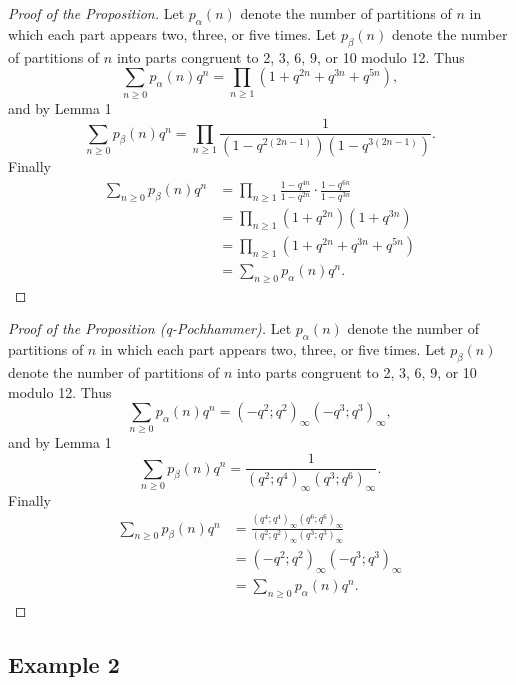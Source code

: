\begin{proof}[Proof of the Proposition]
        Let $p_\alpha(n)$ denote the number of partitions of $n$
        in which each part appears two, three, or five times.
        Let $p_\beta(n)$ denote the number of partitions of $n$
        into parts congruent to 2, 3, 6, 9, or 10 modulo 12.
        Thus
        \[
            \sum_{n\ge 0}p_\alpha(n)q^n=\prod_{n\ge 1}\left(1+q^{2n}+q^{3n}+q^{5n}\right),
        \]
        and by Lemma 1
        \[
            \sum_{n\ge 0}p_\beta(n)q^n = \prod_{n\ge 1}\frac{1}{(1-q^{2(2n-1)})(1-q^{3(2n-1)})}.
        \]
        Finally
        \begin{align*}
            \sum_{n\ge 0}p_\beta(n)q^n &=\prod_{n\ge 1} \frac{1-q^{4n}}{1-q^{2n}}\cdot\frac{1-q^{6n}}{1-q^{3n}} \\[0.5em]
            &=\prod_{n\ge 1}\left(1+q^{2n}\right)\left(1+q^{3n}\right)\\[0.5em]
            &=\prod_{n\ge 1}\left(1+q^{2n}+q^{3n}+q^{5n}\right)\\[0.5em]
            &=\sum_{n\ge 0}p_\alpha(n)q^n.
        \end{align*}
\end{proof}

\begin{proof}[Proof of the Proposition (q-Pochhammer)]
        Let $p_\alpha(n)$ denote the number of partitions of $n$
        in which each part appears two, three, or five times.
        Let $p_\beta(n)$ denote the number of partitions of $n$
        into parts congruent to 2, 3, 6, 9, or 10 modulo 12.
        Thus
        \[
            \sum_{n\ge 0}p_\alpha(n)q^n=(-q^2;q^2)_\infty (-q^3;q^3)_\infty,
        \]
        and by Lemma 1
        \[
            \sum_{n\ge 0}p_\beta(n)q^n = \frac{1}{(q^2;q^4)_\infty(q^3;q^6)_\infty}.
        \]
        Finally
        \begin{align*}
            \sum_{n\ge 0}p_\beta(n)q^n &= \frac{(q^4;q^4)_\infty (q^6;q^6)_\infty}{(q^2;q^2)_\infty (q^3;q^3)_\infty} \\[0.5em]
            &= (-q^2;q^2)_\infty (-q^3;q^3)_\infty \\[0.5em]
            &= \sum_{n\ge 0}p_\alpha(n)q^n.
        \end{align*}
\end{proof}

\newpage

\subsection*{Example 2}\label{subsec:example-2}

